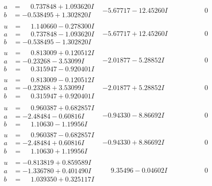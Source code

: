 \documentclass[1p]{elsarticle_modified}
\theoremstyle{definition}
\begin{document}
$$\begin{array}{c|c|c}
\begin{aligned}
a &= \phantom{-}0.737848 + 1.093620 I \\
b &= -0.538495 + 1.302820 I\end{aligned}
 & -5.67717 - 12.45260 I & \phantom{-0.000000 } 0 \\ \hline\begin{aligned}
u &= \phantom{-}1.140660 - 0.278300 I \\
a &= \phantom{-}0.737848 - 1.093620 I \\
b &= -0.538495 - 1.302820 I\end{aligned}
 & -5.67717 + 12.45260 I & \phantom{-0.000000 } 0 \\ \hline\begin{aligned}
u &= \phantom{-}0.813009 + 0.120512 I \\
a &= -0.23268 - 3.53099 I \\
b &= \phantom{-}0.315947 - 0.920401 I\end{aligned}
 & -2.01877 - 5.28852 I & \phantom{-0.000000 } 0 \\ \hline\begin{aligned}
u &= \phantom{-}0.813009 - 0.120512 I \\
a &= -0.23268 + 3.53099 I \\
b &= \phantom{-}0.315947 + 0.920401 I\end{aligned}
 & -2.01877 + 5.28852 I & \phantom{-0.000000 } 0 \\ \hline\begin{aligned}
u &= \phantom{-}0.960387 + 0.682857 I \\
a &= -2.48484 - 0.60816 I \\
b &= \phantom{-}1.10630 - 1.19956 I\end{aligned}
 & -0.94330 - 8.86692 I & \phantom{-0.000000 } 0 \\ \hline\begin{aligned}
u &= \phantom{-}0.960387 - 0.682857 I \\
a &= -2.48484 + 0.60816 I \\
b &= \phantom{-}1.10630 + 1.19956 I\end{aligned}
 & -0.94330 + 8.86692 I & \phantom{-0.000000 } 0 \\ \hline\begin{aligned}
u &= -0.813819 + 0.859589 I \\
a &= -1.336780 + 0.401490 I \\
b &= \phantom{-}1.039350 + 0.325117 I\end{aligned}
 & \phantom{-}9.35496 - 0.04602 I & \phantom{-0.000000 } 0 \\ \hline\begin{aligned}

\end{aligned}
\end{array}$$
\end{document}
